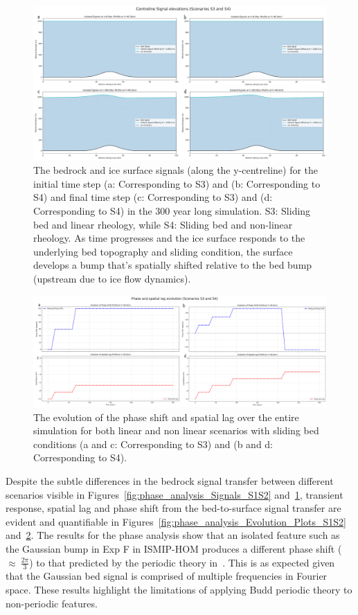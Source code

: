\begin{figure}[H]
    \includegraphics[scale=0.23]{figures/S3F_S4F_signals.pdf}
    \caption{The bedrock and ice surface signals (along the y-centreline) for the initial time step (a: Corresponding to S3) and (b: Corresponding to S4) and final time step (c: Corresponding to S3) and (d: Corresponding to S4) in the 300 year long simulation. S3: Sliding bed and linear rheology, while S4: Sliding bed and non-linear rheology. As time progresses and the ice surface responds to the underlying bed topography and sliding condition, the surface develops a bump that's spatially shifted relative to the bed bump (upstream due to ice flow dynamics).}
    \label{fig:phase_analysis_Signals_S3S4}
\end{figure}
\begin{figure}[H]
    \includegraphics[scale=0.23]{figures/S3F_S4F_phase-evolution.pdf}
    \caption{The evolution of the phase shift and spatial lag over the entire simulation for both linear and non linear scenarios with sliding bed conditions (a and c: Corresponding to S3) and (b and d: Corresponding to S4).}
    \label{fig:phase_analysis_Evolution_Plots_S3S4}
\end{figure}
Despite the subtle differences in the bedrock signal transfer between different scenarios visible in Figures~\ref{fig:phase_analysis_Signals_S1S2} and~\ref{fig:phase_analysis_Signals_S3S4}, transient response, spatial lag and phase shift from the bed-to-surface signal transfer are evident and quantifiable in Figures~\ref{fig:phase_analysis_Evolution_Plots_S1S2} and~\ref{fig:phase_analysis_Evolution_Plots_S3S4}.
The results for the phase analysis show that an isolated feature such as the Gaussian bump in Exp F in ISMIP-HOM produces a different phase shift ($\approx~\frac{2\pi}{3}$) to that predicted by the periodic theory in~\cite{Budd_1970}. This is as expected given that the Gaussian bed signal is comprised of multiple frequencies in Fourier space. These results highlight the limitations of applying Budd periodic theory to non-periodic features.

